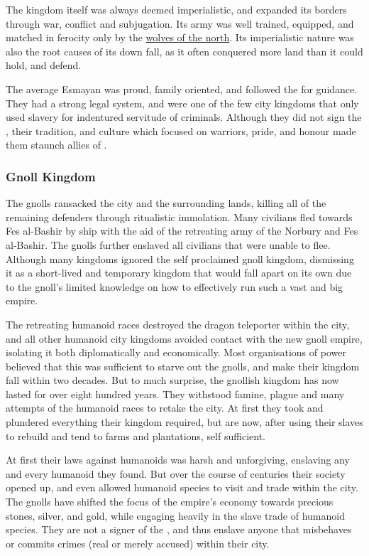 The kingdom itself was always deemed imperialistic, and expanded its borders
through war, conflict and subjugation. Its army was well trained, equipped,
and matched in ferocity only by the \hyperref[sec:Norbury]{wolves of the
  north}. Its imperialistic nature was also the root causes of its down fall,
as it often conquered more land than it could hold, and defend.

The average Esmayan was proud, family oriented, and followed the
 for guidance. They had a strong legal system, and were one
of the few city kingdoms that only used slavery for indentured servitude of
criminals. Although they did not sign the , their
tradition, and culture which focused on warriors, pride, and honour made them
staunch allies of .

\subsubsection{Gnoll Kingdom}

The gnolls ransacked the city and the surrounding lands, killing all of the
remaining defenders through ritualistic immolation. Many civilians fled
towards Fes al-Bashir by ship with the aid of the retreating army of the
Norbury and Fes al-Bashir. The gnolls further enslaved all civilians that were
unable to flee. Although many kingdoms ignored the self proclaimed gnoll
kingdom, dismissing it as a short-lived and temporary kingdom that would fall
apart on its own due to the gnoll's limited knowledge on how to effectively
run such a vast and big empire.

The retreating humanoid races destroyed the dragon teleporter within the city,
and all other humanoid city kingdoms avoided contact with the new gnoll
empire, isolating it both diplomatically and economically. Most organisations
of power believed that this was sufficient to starve out the gnolls, and make
their kingdom fall within two decades. But to much surprise, the gnollish
kingdom has now lasted for over eight hundred years. They withstood famine,
plague and many attempts of the humanoid races to retake the city. At first
they took and plundered everything their kingdom required, but are now, after
using their slaves to rebuild and tend to farms and plantations, self
sufficient.

At first their laws against humanoids was harsh and unforgiving, enslaving any
and every humanoid they found. But over the course of centuries their society
opened up, and even allowed humanoid species to visit and trade within the
city. The gnolls have shifted the focus of the empire's economy towards
precious stones, silver, and gold, while engaging heavily in the slave trade
of humanoid species. They are not a signer of the ,
and thus enslave anyone that misbehaves or commits crimes (real or merely
accused) within their city.

